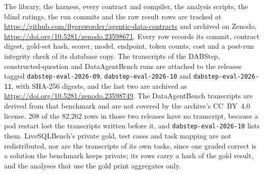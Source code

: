 The library, the harness, every contract and compiler, the analysis
scripts, the blind ratings, the run commits and the raw result rows are
tracked at \url{https://github.com/flyersworder/agentic-data-contracts}
and archived on Zenodo, \url{https://doi.org/10.5281/zenodo.23598671}.
Every row records its commit, contract digest, gold-set hash, scorer,
model, endpoint, token counts, cost and a post-run integrity check of its
database copy. The transcripts of the DABStep, constructed-question and
DataAgentBench runs are attached to the releases tagged
\texttt{dabstep-eval-2026-09}, \texttt{dabstep-eval-2026-10} and
\texttt{dabstep-eval-2026-11}, with SHA-256 digests, and the last two
are archived as \url{https://doi.org/10.5281/zenodo.23598749}. The
DataAgentBench transcripts are derived from that benchmark and are not
covered by the archive's CC~BY~4.0 license. 208 of the 82{,}262 rows in
those two releases have no transcript, because a pod restart lost the
transcripts written before it, and \texttt{dabstep-eval-2026-10} lists
them. LiveSQLBench's
private gold, test cases and task mapping are not redistributed, nor are
the transcripts of its own tasks, since one graded correct is a solution the benchmark
keeps private; its rows carry a hash of the gold result, and the analyses
that use the gold print aggregates only.
\else
\fi

